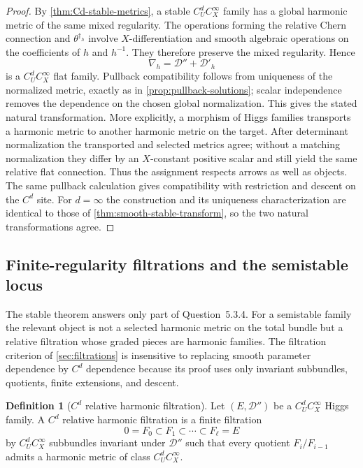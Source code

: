 \documentclass[11pt,reqno]{amsart}
\theoremstyle{definition}
\newtheorem{definition}[theorem]{Definition}
\theoremstyle{remark}
\newcommand{\cD}{\mathcal D}
\begin{document}
\begin{proof}
By \cref{thm:Cd-stable-metrics}, a stable $C^d_UC^\infty_X$ family has a global harmonic metric of the same mixed regularity.  The operations forming the relative Chern connection and $\theta^{\dagger_h}$ involve $X$-differentiation and smooth algebraic operations on the coefficients of $h$ and $h^{-1}$.  They therefore preserve the mixed regularity.  Hence
\[
  \nabla_h=\cD''+\cD'_h
\]
is a $C^d_UC^\infty_X$ flat family.  Pullback compatibility follows from uniqueness of the normalized metric, exactly as in \cref{prop:pullback-solutions}; scalar independence removes the dependence on the chosen global normalization.  This gives the stated natural transformation.
More explicitly, a morphism of Higgs families transports a harmonic
metric to another harmonic metric on the target.  After determinant
normalization the transported and selected metrics agree; without a
matching normalization they differ by an $X$-constant positive scalar
and still yield the same relative flat connection.  Thus the assignment
respects arrows as well as objects.  The same pullback calculation gives
compatibility with restriction and descent on the $C^d$ site.  For
$d=\infty$ the construction and its uniqueness characterization are
identical to those of \cref{thm:smooth-stable-transform}, so the two
natural transformations agree.
\end{proof}

\subsection{Finite-regularity filtrations and the semistable locus}

The stable theorem answers only part of Question~5.3.4.  For a semistable family the relevant object is not a selected harmonic metric on the total bundle but a relative filtration whose graded pieces are harmonic families.  The filtration criterion of \cref{sec:filtrations} is insensitive to replacing smooth parameter dependence by $C^d$ dependence because its proof uses only invariant subbundles, quotients, finite extensions, and descent.

\begin{definition}[$C^d$ relative harmonic filtration]\label{def:Cd-harmonic-filtration}
Let $(E,\cD'')$ be a $C^d_UC^\infty_X$ Higgs family.  A $C^d$ relative harmonic filtration is a finite filtration
\[
  0=F_0\subset F_1\subset\cdots\subset F_\ell=E
\]
by $C^d_UC^\infty_X$ subbundles invariant under $\cD''$ such that every quotient $F_i/F_{i-1}$ admits a harmonic metric of class $C^d_UC^\infty_X$.
\end{definition}
\end{document}
